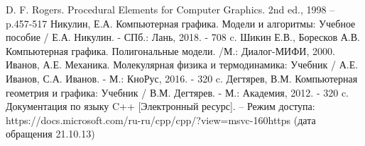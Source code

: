 \documentclass[a4paper,14pt]{report}
\begin{document}
\begin{thebibliography}{6}
 D. F. Rogers. Procedural Elements for Computer Graphics. 2nd ed., 1998 – p.457-517 
 Никулин, Е.А. Компьютерная графика. Модели и алгоритмы: Учебное пособие / Е.А. Никулин. - СПб.: Лань, 2018. - 708 c.
\bibitem{} Шикин Е.В., Боресков А.В. Компьютерная графика. Полигональные модели. /М.: Диалог-МИФИ, 2000.
 Иванов, А.Е. Механика. Молекулярная физика и термодинамика: Учебник / А.Е. Иванов, С.А. Иванов. - М.: КноРус, 2016. - 320 c.
\bibitem{} Дегтярев, В.М. Компьютерная геометрия и графика: Учебник / В.М. Дегтярев. - М.: Академия, 2012. - 320 c.
\bibitem{} Документация по языку C++ [Электронный ресурс]. – Режим доступа: https://docs.microsoft.com/ru-ru/cpp/cpp/?view=msvc-160https (дата обращения 21.10.13)
\end{thebibliography}
\end{document}
